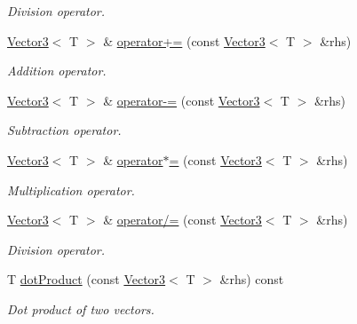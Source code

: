 \begin{DoxyCompactItemize}
\begin{DoxyCompactList}\small\item\em Division operator. \item\end{DoxyCompactList}\item 
\hyperlink{class_vector3}{Vector3}$<$ T $>$ \& \hyperlink{class_vector3_ab50a40b431192f189a9cf0556bcad1c3}{operator+=} (const \hyperlink{class_vector3}{Vector3}$<$ T $>$ \&rhs)
\begin{DoxyCompactList}\small\item\em Addition operator. \item\end{DoxyCompactList}\item 
\hyperlink{class_vector3}{Vector3}$<$ T $>$ \& \hyperlink{class_vector3_ae0bc9179d39a0c80e30c598ffb0639a8}{operator-\/=} (const \hyperlink{class_vector3}{Vector3}$<$ T $>$ \&rhs)
\begin{DoxyCompactList}\small\item\em Subtraction operator. \item\end{DoxyCompactList}\item 
\hyperlink{class_vector3}{Vector3}$<$ T $>$ \& \hyperlink{class_vector3_ab318211043865788f6814e57cc4b6da4}{operator$\ast$=} (const \hyperlink{class_vector3}{Vector3}$<$ T $>$ \&rhs)
\begin{DoxyCompactList}\small\item\em Multiplication operator. \item\end{DoxyCompactList}\item 
\hyperlink{class_vector3}{Vector3}$<$ T $>$ \& \hyperlink{class_vector3_ad0a6161051a0b8bd93c146a0159ce495}{operator/=} (const \hyperlink{class_vector3}{Vector3}$<$ T $>$ \&rhs)
\begin{DoxyCompactList}\small\item\em Division operator. \item\end{DoxyCompactList}\item 
T \hyperlink{class_vector3_a2f1fdf1c794d6337892d5502459d5ccb}{dotProduct} (const \hyperlink{class_vector3}{Vector3}$<$ T $>$ \&rhs) const 
\begin{DoxyCompactList}\small\item\em Dot product of two vectors. \item\end{DoxyCompactList}\item 

\end{DoxyCompactItemize}
